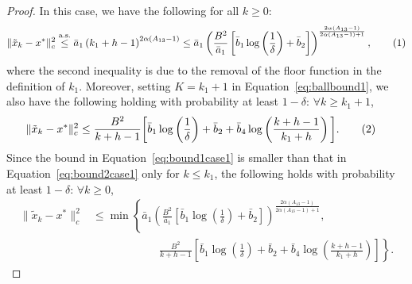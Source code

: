\documentclass{article}
\newcommand{\numberthis}{\addtocounter{equation}{1}\tag{\theequation}}
\newcommand{\lrp}[1]{\left( #1 \right)}
\begin{document}
\begin{proof}
 In this case, we have the following for all $k \ge 0$: 
\[ \|\tilde{x}_k - x^*\|^2_c 
\overset{\text{a.s.}}{\le} \bar{a}_1 \lrp{k_1+h-1}^{2\alpha (A_{13}-1)} \leq \bar{a}_1 \lrp{\frac{B^2}{\bar{a}_1} \left[\bar{b}_1\log\left(\frac{1}{\delta}\right) + \bar{b}_2 \right]}^\frac{2\alpha (A_{13}-1)}{2\alpha (A_{13}-1) + 1}, \numberthis\label{eq:bound1case1}\]
where the second inequality is due to the removal of the floor function in the definition of $k_1$. Moreover, setting $K=k_1+1$ in Equation~\eqref{eq:ballbound1}, we also have the following holding with probability at least $1-\delta$: $\forall k \ge k_1 + 1$, 
\begin{align*}
\|\tilde{x}_k - x^*\|^2_c 
&\leq \frac{B^2}{k+h-1} \bigg[\bar{b}_1\log\left(\frac{1}{\delta}\right) + \bar{b}_2  + \bar{b}_4 \log\left(\frac{k+h-1}{ k_1+h}\right)\bigg]. \numberthis\label{eq:bound2case1}
\end{align*}
Since the bound in Equation~\eqref{eq:bound1case1} is smaller than that in Equation~\eqref{eq:bound2case1} only for  $k\leq k_1$, the following holds with probability at least $1-\delta$: $\forall k \ge 0$,
\begin{align*}
 \|\tilde{x}_k - x^*\|^2_c 
&\leq \min\left\{ \bar{a}_1 \lrp{\frac{B^2}{\bar{a}_1} \left[\bar{b}_1\log\left(\frac{1}{\delta}\right) + \bar{b}_2 \right]}^\frac{2\alpha (A_{13}-1)}{2\alpha (A_{13}-1) + 1}, \right. \\
&\qquad\qquad\qquad \left. \frac{B^2}{k+h-1} \left[\bar{b}_1\log\left(\frac{1}{\delta}\right) + \bar{b}_2 + \bar{b}_4 \log\left(\frac{k+h-1}{k_1+h}\right)\right] \right\}.
\end{align*}


\end{proof}
\end{document}
